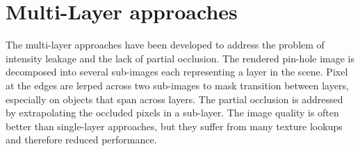 \section{Multi-Layer approaches}
The multi-layer approaches have been developed to address the problem of intensity leakage and the lack of partial occlusion.
The rendered pin-hole image is decomposed into several sub-images each representing a layer in the scene.
Pixel at the edges are lerped across two sub-images to mask transition between layers, especially on objects that span across layers.
The partial occlusion is addressed by extrapolating the occluded pixels in a sub-layer.
The image quality is often better than single-layer approaches, but they suffer from many texture lookups and therefore reduced performance.

\cite{Kraus.2007}

